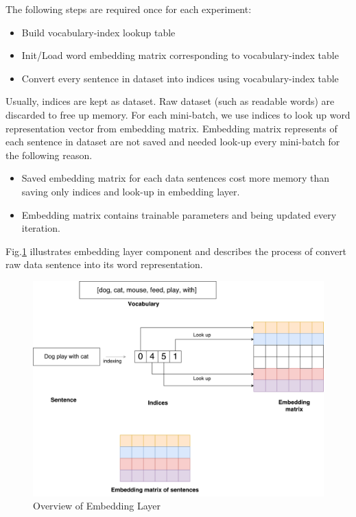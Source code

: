 The following steps are required once for each experiment:
\begin{itemize}
    \item Build vocabulary-index lookup table
    \item Init/Load word embedding matrix corresponding to vocabulary-index table
    \item Convert every sentence in dataset into indices using vocabulary-index table
\end{itemize}
Usually, indices are kept as dataset. Raw dataset (such as readable words) are discarded to free up memory. For each mini-batch, we use indices to look up word representation vector from embedding matrix. Embedding matrix represents of each sentence in dataset are not saved and needed look-up every mini-batch for the following reason.
\begin{itemize}
    \item Saved embedding matrix for each data sentences cost more memory than saving only indices and look-up in embedding layer.
    \item Embedding matrix contains trainable parameters and being updated every iteration.
\end{itemize}

Fig.\ref{fig:embeddinglayer} illustrates embedding layer component and describes the process of convert raw data sentence into its word representation.

\begin{figure}[H]
    \centering
    \includegraphics[width=0.9\linewidth]{figure/embeddinglayer.pdf}
    \caption[Overview of embedding layer]{Overview of Embedding Layer}
    \label{fig:embeddinglayer}
\end{figure}



